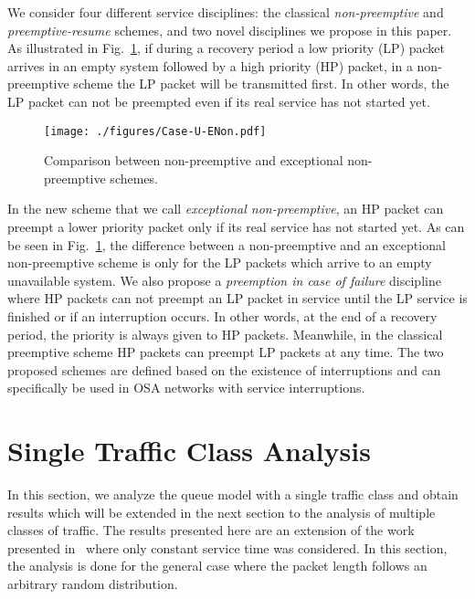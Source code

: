 \documentclass[11pt,journal,oneside,onecolumn,draftclsnofoot]{IEEEtran}
\begin{document}
We consider four different service disciplines: the classical \emph{non-preemptive} and \emph{preemptive-resume} schemes\cite{bertsekas92}, and two novel disciplines we propose in this paper. As illustrated in Fig.~\ref{Case-U-ENon}, if during a recovery period a low priority (LP) packet arrives in an empty system followed by a high priority (HP) packet, in a non-preemptive scheme the LP packet will be transmitted first. In other words, the LP packet can not be preempted even if its real service has not started yet. 
\begin{figure}\texttt{[image: ./figures/Case-U-ENon.pdf]}\caption{Comparison between non-preemptive and exceptional non-preemptive schemes.}\label{Case-U-ENon}\end{figure}
In the new scheme that we call \emph{exceptional non-preemptive}, an HP packet can preempt a lower priority packet only if its real service has not started yet. As can be seen in Fig.~\ref{Case-U-ENon}, the difference between a non-preemptive and an exceptional non-preemptive scheme is only for the LP packets which arrive to an empty unavailable system. We also propose a \emph{preemption in case of failure} discipline where HP packets can not preempt an LP packet in service until the LP service is finished or if an interruption occurs. In other words, at the end of a recovery period, the priority is always given to HP packets. Meanwhile, in the classical preemptive scheme HP  packets can preempt LP packets at any time. 
The two proposed schemes are defined based on the existence of interruptions and can specifically be used in OSA networks with service interruptions.


\section{Single Traffic Class Analysis}
\label{sec:queue-analysis}

In this section, we analyze the queue model with a single traffic class and obtain results which will be extended in the next section to the analysis of multiple classes of traffic. The results presented here are an extension of the work presented in~\cite{azarfar12e} where only constant service time was considered. In this section, the analysis is done for the general case where the packet length follows an arbitrary random distribution.
\end{document}
